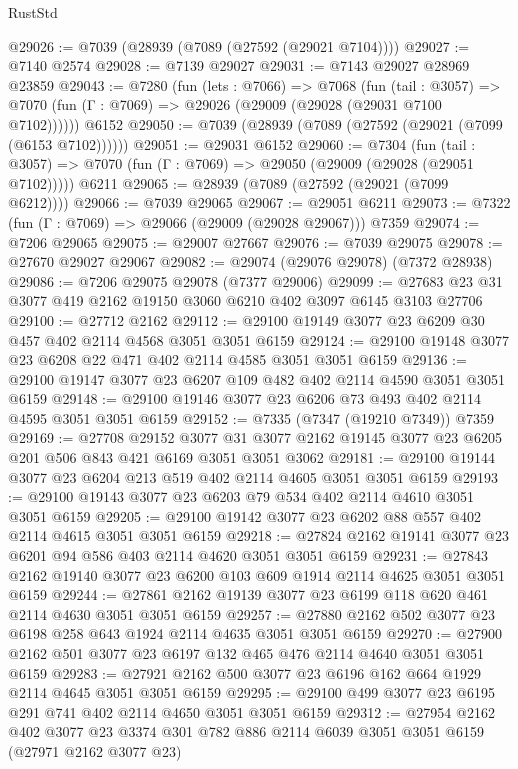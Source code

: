 \begin{lexlean}{RustStd}
\begin{coremodule}
@29026 := @7039 (@28939 (@7089 (@27592 (@29021 @7104))))
@29027 := @7140 @2574
@29028 := @7139 @29027
@29031 := @7143 @29027 @28969 @23859
@29043 := @7280
    (fun (lets : @7066) =>
    @7068
      (fun (tail : @3057) =>
      @7070 (fun (Γ : @7069) => @29026 (@29009 (@29028 (@29031 @7100 @7102))))))
    @6152
@29050 := @7039 (@28939 (@7089 (@27592 (@29021 (@7099 (@6153 @7102))))))
@29051 := @29031 @6152
@29060 := @7304
    (fun (tail : @3057) => @7070 (fun (Γ : @7069) => @29050 (@29009 (@29028 (@29051 @7102)))))
    @6211
@29065 := @28939 (@7089 (@27592 (@29021 (@7099 @6212))))
@29066 := @7039 @29065
@29067 := @29051 @6211
@29073 := @7322 (fun (Γ : @7069) => @29066 (@29009 (@29028 @29067))) @7359
@29074 := @7206 @29065
@29075 := @29007 @27667
@29076 := @7039 @29075
@29078 := @27670 @29027 @29067
@29082 := @29074 (@29076 @29078) (@7372 @28938)
@29086 := @7206 @29075 @29078 (@7377 @29006)
@29099 := @27683 @23 @31 @3077 @419 @2162 @19150 @3060 @6210 @402 @3097 @6145 @3103 @27706
@29100 := @27712 @2162
@29112 := @29100 @19149 @3077 @23 @6209 @30 @457 @402 @2114 @4568 @3051 @3051 @6159
@29124 := @29100 @19148 @3077 @23 @6208 @22 @471 @402 @2114 @4585 @3051 @3051 @6159
@29136 := @29100 @19147 @3077 @23 @6207 @109 @482 @402 @2114 @4590 @3051 @3051 @6159
@29148 := @29100 @19146 @3077 @23 @6206 @73 @493 @402 @2114 @4595 @3051 @3051 @6159
@29152 := @7335 (@7347 (@19210 @7349)) @7359
@29169 := @27708
    @29152
    @3077
    @31
    @3077
    @2162
    @19145
    @3077
    @23
    @6205
    @201
    @506
    @843
    @421
    @6169
    @3051
    @3051
    @3062
@29181 := @29100 @19144 @3077 @23 @6204 @213 @519 @402 @2114 @4605 @3051 @3051 @6159
@29193 := @29100 @19143 @3077 @23 @6203 @79 @534 @402 @2114 @4610 @3051 @3051 @6159
@29205 := @29100 @19142 @3077 @23 @6202 @88 @557 @402 @2114 @4615 @3051 @3051 @6159
@29218 := @27824 @2162 @19141 @3077 @23 @6201 @94 @586 @403 @2114 @4620 @3051 @3051 @6159
@29231 := @27843 @2162 @19140 @3077 @23 @6200 @103 @609 @1914 @2114 @4625 @3051 @3051 @6159
@29244 := @27861 @2162 @19139 @3077 @23 @6199 @118 @620 @461 @2114 @4630 @3051 @3051 @6159
@29257 := @27880 @2162 @502 @3077 @23 @6198 @258 @643 @1924 @2114 @4635 @3051 @3051 @6159
@29270 := @27900 @2162 @501 @3077 @23 @6197 @132 @465 @476 @2114 @4640 @3051 @3051 @6159
@29283 := @27921 @2162 @500 @3077 @23 @6196 @162 @664 @1929 @2114 @4645 @3051 @3051 @6159
@29295 := @29100 @499 @3077 @23 @6195 @291 @741 @402 @2114 @4650 @3051 @3051 @6159
@29312 := @27954
    @2162
    @402
    @3077
    @23
    @3374
    @301
    @782
    @886
    @2114
    @6039
    @3051
    @3051
    @6159
    (@27971 @2162 @3077 @23)

\end{coremodule}
\end{lexlean}
